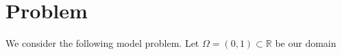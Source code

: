 \section{Problem}
We consider the following model problem. Let $\Omega = (0,1) \subset \mathbb{R}$ be our domain 
\begin{equation}
    
\end{equation} 